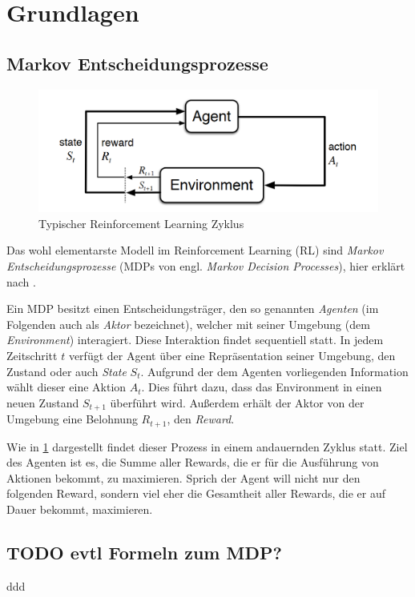 \section{Grundlagen}
\label{sec:basics}

\subsection{Markov Entscheidungsprozesse}
\label{sec:reinforcement}
\begin{figure}[h]
\includegraphics[width=\textwidth, keepaspectratio=true]{images/mdp.png}
\caption{Typischer Reinforcement Learning Zyklus} \label{img:rl_cycle}
\end{figure}
Das wohl elementarste Modell im Reinforcement Learning (RL) sind \textit{Markov Entscheidungsprozesse} (MDPs von engl. \textit{Markov Decision Processes}), hier erklärt nach \cite{deeplizard_markov_decision_processes}.

Ein MDP besitzt einen Entscheidungsträger, den so genannten \textit{Agenten} (im Folgenden auch als \textit{Aktor} bezeichnet), welcher mit seiner Umgebung (dem \textit{Environment}) interagiert. Diese Interaktion findet sequentiell statt. In jedem Zeitschritt $ t $ verfügt der Agent über eine Repräsentation seiner Umgebung, den Zustand oder auch \textit{State} $ S_t $. Aufgrund der dem Agenten vorliegenden Information wählt dieser eine Aktion $ A_t $. Dies führt dazu, dass das Environment in einen neuen Zustand $ S_{t+1} $ überführt wird. Außerdem erhält der Aktor von der Umgebung eine Belohnung $ R_{t+1} $, den \textit{Reward}.

Wie in \ref{img:rl_cycle} dargestellt findet dieser Prozess in einem andauernden Zyklus statt. Ziel des Agenten ist es, die Summe aller Rewards, die er für die Ausführung von Aktionen bekommt, zu maximieren. Sprich der Agent will nicht nur den folgenden Reward, sondern viel eher die Gesamtheit aller Rewards, die er auf Dauer bekommt, maximieren.

\subsection{TODO evtl Formeln zum MDP?}
\label{sec:markov}
ddd